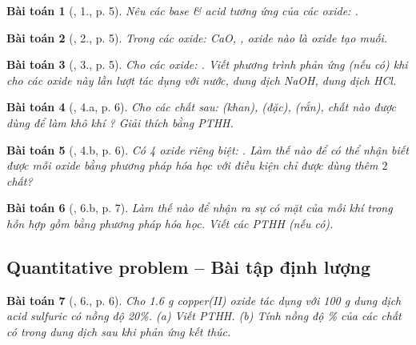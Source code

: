 \documentclass{article}
\newtheorem{baitoan}{Bài toán}
\begin{document}
\begin{baitoan}[\cite{An_350_BT_Hoa_Hoc_9}, 1., p. 5]
	Nêu các base \& acid tương ứng của các oxide: \emph{}.
\end{baitoan}

\begin{baitoan}[\cite{An_350_BT_Hoa_Hoc_9}, 2., p. 5]
	Trong các oxide: \emph{CaO, }, oxide nào là oxide tạo muối.
\end{baitoan}

\begin{baitoan}[\cite{An_350_BT_Hoa_Hoc_9}, 3., p. 5]
	Cho các oxide: \emph{}. Viết phương trình phản ứng (nếu có) khi cho các oxide này lần lượt tác dụng với nước, dung dịch \emph{NaOH}, dung dịch \emph{HCl}.
\end{baitoan}

\begin{baitoan}[\cite{An_350_BT_Hoa_Hoc_9}, 4.a, p. 6]
	Cho các chất sau: \emph{ (khan),  (đặc),  (rắn)}, chất nào được dùng để làm khô khí \emph{}? Giải thích bằng PTHH.
\end{baitoan}

\begin{baitoan}[\cite{An_350_BT_Hoa_Hoc_9}, 4.b, p. 6]
	Có 4 oxide riêng biệt: \emph{}. Làm thế nào để có thể nhận biết được mỗi oxide bằng phương pháp hóa học với điều kiện chỉ được dùng thêm $2$ chất?
\end{baitoan}

\begin{baitoan}[\cite{An_350_BT_Hoa_Hoc_9}, 6.b, p. 7]
	Làm thế nào để nhận ra sự có mặt của mỗi khí trong hỗn hợp gồm \emph{} bằng phương pháp hóa học. Viết các PTHH (nếu có).
\end{baitoan}

\subsection{Quantitative problem -- Bài tập định lượng}

\begin{baitoan}[\cite{SGK_Hoa_Hoc_9}, 6., p. 6]
	Cho \emph{1.6 g} copper(II) oxide tác dụng với \emph{100 g} dung dịch acid sulfuric có nồng độ \emph{20\%}. (a) Viết PTHH. (b) Tính nồng độ \% của các chất có trong dung dịch sau khi phản ứng kết thúc.
\end{baitoan}
\end{document}
